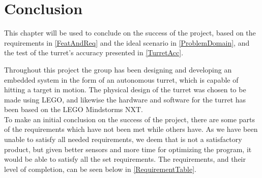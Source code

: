 \chapter{Conclusion}\label{FinalConclusion}
This chapter will be used to conclude on the success of the project, based on
the requirements in \autoref{FeatAndReq} and the ideal scenario in \autoref{ProblemDomain},
and the test of the turret's accuracy presented in \autoref{TurretAcc}. \nl

Throughout this project the group has been designing and developing an embedded
system in the form of an autonomous turret, which is capable of hitting a target
in motion. The physical design of the turret was chosen to be made using LEGO,
and likewise the hardware and software for the turret has been based on the LEGO
Mindstorms NXT.\\
To make an initial conclusion on the success of the project, there are some
parts of the requirements which have not been met while others have.
As we have been unable to satisfy all needed requirements, we deem that \name
is not a satisfactory product, but given better sensors and more time for
optimizing the program, it would be able to satisfy all the set requirements. 
The requirements, and their level of completion, can be
seen below in \autoref{RequirementTable}.

